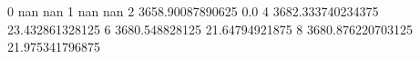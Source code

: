 0 nan nan
1 nan nan
2 3658.90087890625 0.0
4 3682.333740234375 23.432861328125
6 3680.548828125 21.64794921875
8 3680.876220703125 21.975341796875
